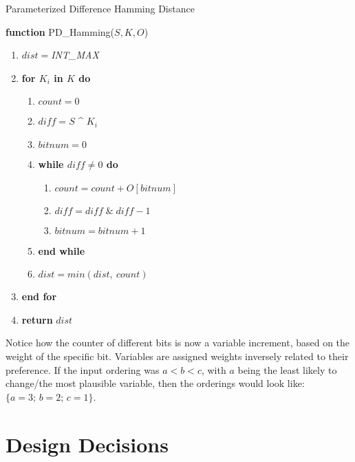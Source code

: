 \documentclass[english]{article}
\begin{document}
\begin{algorithm}[H]

\caption{Parameterized Difference Hamming Distance}

\textbf{function }PD\_Hamming($S,K,O$)
\begin{enumerate}
\item $dist=$\emph{INT\_MAX}
\item \textbf{for $K_{i}$ in $K$ do}
\begin{enumerate}
\item $count=0$
\item $diff=S$ \textasciicircum{} $K_{i}$
\item $bitnum=0$
\item \textbf{while $diff\neq0$ do}
\begin{enumerate}
\item $count=count+O[bitnum]$
\item $diff=diff\;\&\;diff-1$
\item $bitnum=bitnum+1$
\end{enumerate}
\item \textbf{end while}
\item $dist=min(dist,\:count)$
\end{enumerate}
\item \textbf{end for}
\item \textbf{return }$dist$
\end{enumerate}
\end{algorithm}

\noindent Notice how the counter of different bits is now a variable
increment, based on the weight of the specific bit. Variables are
assigned weights inversely related to their preference. If the input
ordering was $a<b<c$, with $a$ being the least likely to change/the
most plausible variable, then the orderings would look like: $\{a=3;\,b=2;\,c=1\}$. 

\section{Design Decisions}
\end{document}
